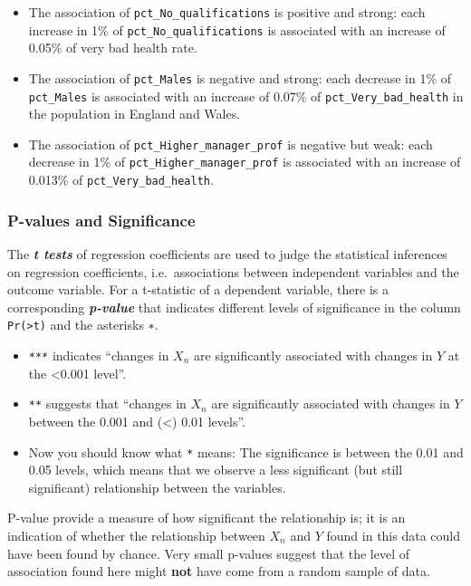 \documentclass[
  letterpaper,
  DIV=11,
  numbers=noendperiod]{scrreprt}
\providecommand{\tightlist}{%
  \setlength{\itemsep}{0pt}\setlength{\parskip}{0pt}}\usepackage{longtable,booktabs,array}
\begin{document}
\begin{itemize}
\tightlist
\item
  The association of \texttt{pct\_No\_qualifications} is positive and
  strong: each increase in 1\% of \texttt{pct\_No\_qualifications} is
  associated with an increase of 0.05\% of very bad health rate.
\item
  The association of \texttt{pct\_Males} is negative and strong: each
  decrease in 1\% of \texttt{pct\_Males} is associated with an increase
  of 0.07\% of \texttt{pct\_Very\_bad\_health} in the population in
  England and Wales.
\item
  The association of \texttt{pct\_Higher\_manager\_prof} is negative but
  weak: each decrease in 1\% of \texttt{pct\_Higher\_manager\_prof} is
  associated with an increase of 0.013\% of
  \texttt{pct\_Very\_bad\_health}.
\end{itemize}

\subsubsection{P-values and
Significance}\label{p-values-and-significance}

The \textbf{\emph{t tests}} of regression coefficients are used to judge
the statistical inferences on regression coefficients, i.e.~associations
between independent variables and the outcome variable. For a
t-statistic of a dependent variable, there is a corresponding
\textbf{\emph{p-value}} that indicates different levels of significance
in the column \texttt{Pr(\textgreater{}\textbar{}t\textbar{})} and the
asterisks \texttt{∗}.

\begin{itemize}
\tightlist
\item
  \texttt{***} indicates ``changes in \(X_n\) are significantly
  associated with changes in \(Y\) at the \textless0.001 level''.
\item
  \texttt{**} suggests that ``changes in \(X_n\) are significantly
  associated with changes in \(Y\) between the 0.001 and (\textless)
  0.01 levels''.
\item
  Now you should know what \texttt{*} means: The significance is between
  the 0.01 and 0.05 levels, which means that we observe a less
  significant (but still significant) relationship between the
  variables.
\end{itemize}

P-value provide a measure of how significant the relationship is; it is
an indication of whether the relationship between \(X_n\) and \(Y\)
found in this data could have been found by chance. Very small p-values
suggest that the level of association found here might \textbf{not} have
come from a random sample of data.
\end{document}
